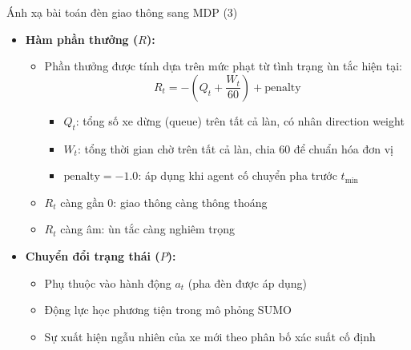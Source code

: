 \begin{frame}{Ánh xạ bài toán đèn giao thông sang MDP (3)}
\begin{itemize}
    \item \textbf{Hàm phần thưởng ($R$):}
    \begin{itemize}
        \item Phần thưởng được tính dựa trên mức phạt từ tình trạng ùn tắc hiện tại:
        \[
        R_t = -\left( Q_t + \frac{W_t}{60} \right) + \text{penalty}
        \]
        \begin{itemize}
            \item $Q_t$: tổng số xe dừng (queue) trên tất cả làn, có nhân direction weight
            \item $W_t$: tổng thời gian chờ trên tất cả làn, chia 60 để chuẩn hóa đơn vị
            \item $\text{penalty} = -1.0$: áp dụng khi agent cố chuyển pha trước $t_{\min}$
        \end{itemize}
        \item $R_t$ càng gần 0: giao thông càng thông thoáng
        \item $R_t$ càng âm: ùn tắc càng nghiêm trọng
    \end{itemize}

    \item \textbf{Chuyển đổi trạng thái ($P$):}
    \begin{itemize}
        \item Phụ thuộc vào hành động $a_t$ (pha đèn được áp dụng)
        \item Động lực học phương tiện trong mô phỏng SUMO
        \item Sự xuất hiện ngẫu nhiên của xe mới theo phân bố xác suất cố định
    \end{itemize}
\end{itemize}
\end{frame}
